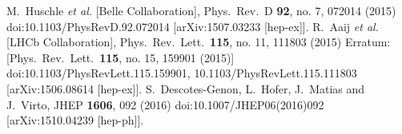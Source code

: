 \documentclass[12pt]{article}
\begin{document}
\begin{thebibliography}{9}
  M.~Huschle {\it et al.} [Belle Collaboration],
  Phys.\ Rev.\ D {\bf 92}, no. 7, 072014 (2015)
  doi:10.1103/PhysRevD.92.072014
  [arXiv:1507.03233 [hep-ex]].
  R.~Aaij {\it et al.} [LHCb Collaboration],
  Phys.\ Rev.\ Lett.\  {\bf 115}, no. 11, 111803 (2015)
  Erratum: [Phys.\ Rev.\ Lett.\  {\bf 115}, no. 15, 159901 (2015)]
  doi:10.1103/PhysRevLett.115.159901, 10.1103/PhysRevLett.115.111803
  [arXiv:1506.08614 [hep-ex]].
  S.~Descotes-Genon, L.~Hofer, J.~Matias and J.~Virto,
  JHEP {\bf 1606}, 092 (2016)
  doi:10.1007/JHEP06(2016)092
  [arXiv:1510.04239 [hep-ph]].
\end{thebibliography}
\newpage
\end{document}
